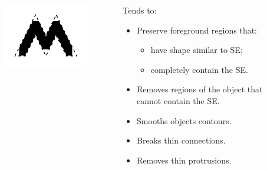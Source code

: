 \begin{frame}
\begin{columns}
\begin{column}{.3\textwidth}
\begin{figure}
\centering
\includegraphics[width=\textwidth]{openb.png}
\end{figure}
\end{column}
\begin{column}{.7\textwidth}
Tends to:
\begin{itemize}
\item Preserve foreground regions that:
\begin{itemize}
\item have shape similar to SE;
\item completely contain the SE.
\end{itemize}
\item Removes regions of the object that cannot contain the SE.
\item Smooths objects contours.
\item Breaks thin connections.
\item Removes thin protrusions.
\end{itemize}
\end{column}
\end{columns}
\end{frame}

